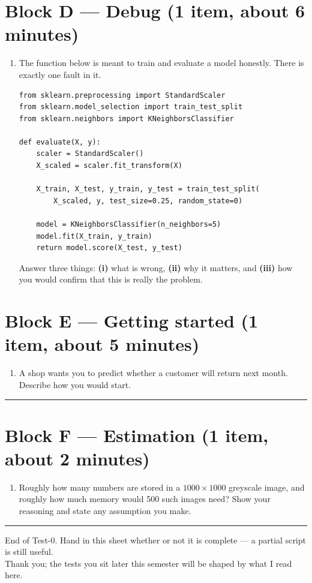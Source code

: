 \documentclass[11pt]{article}
\begin{document}
\section*{Block D --- Debug \hfill \normalfont\small(1 item, about 6 minutes)}
\begin{enumerate}[label=D\arabic*.,leftmargin=*]
  \item The function below is meant to train and evaluate a model honestly. There is exactly one
    fault in it.
\begin{lstlisting}
from sklearn.preprocessing import StandardScaler
from sklearn.model_selection import train_test_split
from sklearn.neighbors import KNeighborsClassifier

def evaluate(X, y):
    scaler = StandardScaler()
    X_scaled = scaler.fit_transform(X)

    X_train, X_test, y_train, y_test = train_test_split(
        X_scaled, y, test_size=0.25, random_state=0)

    model = KNeighborsClassifier(n_neighbors=5)
    model.fit(X_train, y_train)
    return model.score(X_test, y_test)
\end{lstlisting}
    Answer three things: \textbf{(i)} what is wrong, \textbf{(ii)} why it matters, and
    \textbf{(iii)} how you would confirm that this is really the problem.

    \vspace{60mm}
\end{enumerate}

\newpage

\section*{Block E --- Getting started \hfill \normalfont\small(1 item, about 5 minutes)}
\begin{enumerate}[label=E\arabic*.,leftmargin=*]
  \item A shop wants you to predict whether a customer will return next month. Describe how you would
    start.

    \vspace{80mm}
\end{enumerate}

\bigskip\hrule\bigskip

\section*{Block F --- Estimation \hfill \normalfont\small(1 item, about 2 minutes)}
\begin{enumerate}[label=F\arabic*.,leftmargin=*]
  \item Roughly how many numbers are stored in a $1000 \times 1000$ greyscale image, and roughly how
    much memory would 500 such images need? Show your reasoning and state any assumption you make.

    \vspace{55mm}
\end{enumerate}

\bigskip\hrule\bigskip

\begin{center}
\small\color{gray}
End of Test-0. Hand in this sheet whether or not it is complete --- a partial script is still useful.\\
Thank you; the tests you sit later this semester will be shaped by what I read here.
\end{center}
\end{document}
